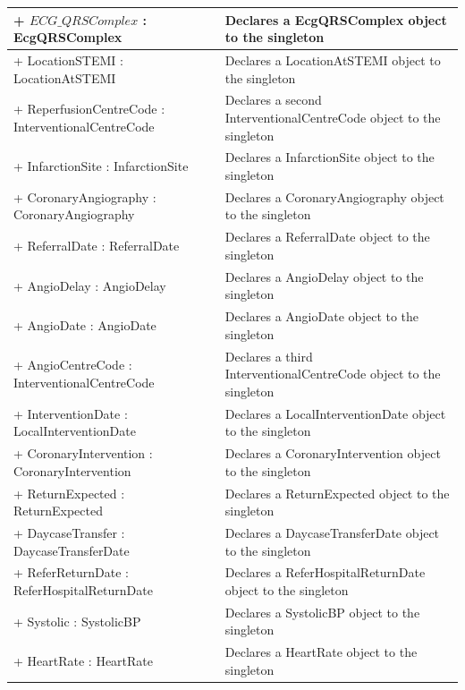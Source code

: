 \documentclass[12pt,a4paper,oneside,titlepage]{article}
\begin{document}
\begin{center}
	\begin{tabular}{| p{13cm} | p{5cm} |}
	\hline
+ $ECG\_QRSComplex$ : EcgQRSComplex & 	Declares a EcgQRSComplex object to the singleton\\ \hline
+ LocationSTEMI : LocationAtSTEMI	 & Declares a LocationAtSTEMI object to the singleton\\ \hline
+ ReperfusionCentreCode : InterventionalCentreCode	 & Declares a second InterventionalCentreCode object to the singleton\\ \hline
+ InfarctionSite : InfarctionSite	 & Declares a InfarctionSite object to the singleton\\ \hline
+ CoronaryAngiography : CoronaryAngiography	 & Declares a CoronaryAngiography object to the singleton\\ \hline
+ ReferralDate : ReferralDate	 & Declares a ReferralDate object to the singleton\\ \hline
+ AngioDelay : AngioDelay & 	Declares a AngioDelay object to the singleton\\ \hline
+ AngioDate : AngioDate & 	Declares a AngioDate object to the singleton\\ \hline
+ AngioCentreCode : InterventionalCentreCode	 & Declares a third InterventionalCentreCode object to the singleton\\ \hline
+ InterventionDate : LocalInterventionDate	 & Declares a LocalInterventionDate object to the singleton\\ \hline
+ CoronaryIntervention : CoronaryIntervention	 & Declares a CoronaryIntervention object to the singleton\\ \hline
+ ReturnExpected : ReturnExpected	 & Declares a ReturnExpected object to the singleton\\ \hline
+ DaycaseTransfer : DaycaseTransferDate	 & Declares a DaycaseTransferDate object to the singleton\\ \hline
+ ReferReturnDate : ReferHospitalReturnDate & 	Declares a ReferHospitalReturnDate object to the singleton\\ \hline
+ Systolic : SystolicBP	 & Declares a SystolicBP object to the singleton\\ \hline
+ HeartRate : HeartRate	 & Declares a HeartRate object to the singleton\\ \hline
\end{tabular}
\end{center}
\end{document}
